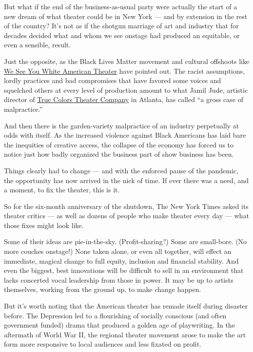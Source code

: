 But what if the end of the business-as-usual party were actually the
start of a new dream of what theater could be in New York --- and by
extension in the rest of the country? It's not as if the shotgun
marriage of art and industry that for decades decided what and whom we
see onstage had produced an equitable, or even a sensible, result.

Just the opposite, as the Black Lives Matter movement and cultural
offshoots like \href{https://www.weseeyouwat.com/}{We See You White
American Theater} have pointed out. The racist assumptions, lordly
practices and bad compromises that have favored some voices and
squelched others at every level of production amount to what Jamil Jude,
artistic director of \href{https://truecolorstheatre.org/}{True Colors
Theater Company} in Atlanta, has called ``a gross case of malpractice.''

And then there is the garden-variety malpractice of an industry
perpetually at odds with itself. As the increased violence against Black
Americans has laid bare the inequities of creative access, the collapse
of the economy has forced us to notice just how badly organized the
business part of show business has been.

Things clearly had to change --- and with the enforced pause of the
pandemic, the opportunity has now arrived in the nick of time. If ever
there was a need, and a moment, to fix the theater, this is it.

So for the six-month anniversary of the shutdown, The New York Times
asked its theater critics --- as well as dozens of people who make
theater every day --- what those fixes might look like.

Some of their ideas are pie-in-the-sky. (Profit-sharing?) Some are
small-bore. (No more couches onstage!) None taken alone, or even all
together, will effect an immediate, magical change to full equity,
inclusion and financial stability. And even the biggest, best
innovations will be difficult to sell in an environment that lacks
concerted vocal leadership from those in power. It may be up to artists
themselves, working from the ground up, to make change happen.

But it's worth noting that the American theater has remade itself during
disaster before. The Depression led to a flourishing of socially
conscious (and often government funded) drama that produced a golden age
of playwriting. In the aftermath of World War II, the regional theater
movement arose to make the art form more responsive to local audiences
and less fixated on profit.

